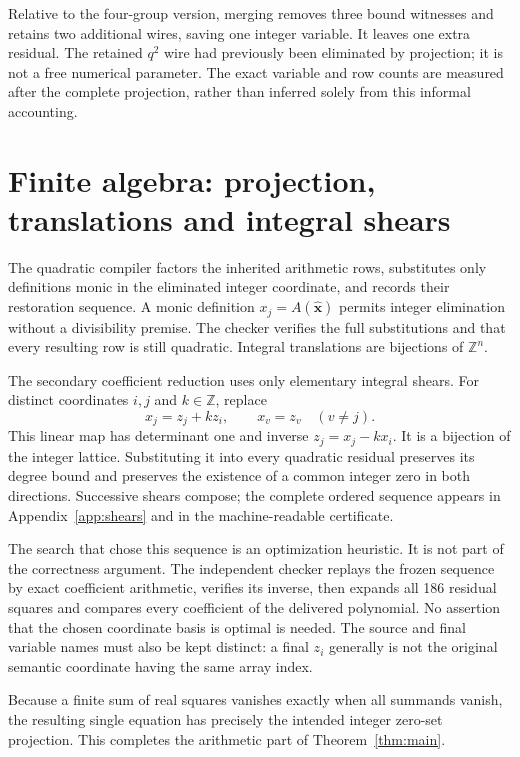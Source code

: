 \documentclass[10pt,letterpaper]{article}
\theoremstyle{definition}\newtheorem{definition}[theorem]{Definition}
\newcommand{\ZZ}{\mathbb Z}
\begin{document}
Relative to the four-group version, merging removes three bound witnesses
and retains two additional wires, saving one integer variable. It leaves
one extra residual. The retained $q^2$ wire had previously been eliminated
by projection; it is not a free numerical parameter. The exact variable
and row counts are measured after the complete projection, rather than
inferred solely from this informal accounting.

\section{Finite algebra: projection, translations and integral shears}

The quadratic compiler factors the inherited arithmetic rows, substitutes
only definitions monic in the eliminated integer coordinate, and records
their restoration sequence. A monic definition $x_j=A(\widehat{\mathbf x})$
permits integer elimination without a divisibility premise. The checker
verifies the full substitutions and that every resulting row is still
quadratic. Integral translations are bijections of $\ZZ^n$.

The secondary coefficient reduction uses only elementary integral shears.
For distinct coordinates $i,j$ and $k\in\ZZ$, replace
\begin{equation}\label{eq:shear}
 x_j=z_j+kz_i,\qquad x_v=z_v\quad(v\ne j).
\end{equation}
This linear map has determinant one and inverse $z_j=x_j-kx_i$.
It is a bijection of the integer lattice. Substituting it into every
quadratic residual preserves its degree bound and preserves the existence
of a common integer zero in both directions. Successive shears compose;
the complete ordered sequence appears in Appendix~\ref{app:shears} and
in the machine-readable certificate.

The search that chose this sequence is an optimization heuristic. It is
not part of the correctness argument. The independent checker replays the
frozen sequence by exact coefficient arithmetic, verifies its inverse,
then expands all 186 residual squares and compares every coefficient of
the delivered polynomial. No assertion that the chosen coordinate basis is
optimal is needed. The source and final variable names must also be kept
distinct: a final $z_i$ generally is not the original semantic coordinate
having the same array index.

Because a finite sum of real squares vanishes exactly when all summands
vanish, the resulting single equation has precisely the intended integer
zero-set projection. This completes the arithmetic part of
Theorem~\ref{thm:main}.
\end{document}
